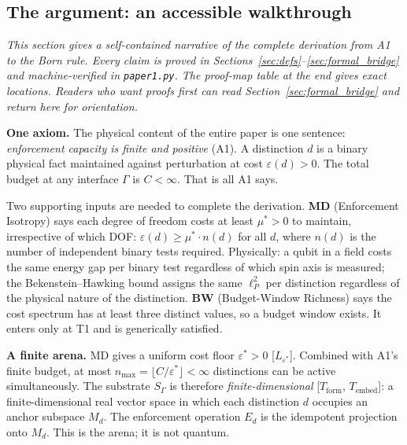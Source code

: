 \documentclass[11pt]{article}
\theoremstyle{remark}
\begin{document}
\subsection{The argument: an accessible walkthrough}
\label{sec:walkthrough}\label{sec:argument}

\noindent\textit{This section gives a self-contained narrative of the complete
derivation from A1 to the Born rule.  Every claim is proved in
Sections~\ref{sec:defs}--\ref{sec:formal_bridge} and machine-verified in
\texttt{paper1.py}.  The proof-map table at the end gives exact locations.
Readers who want proofs first can read Section~\ref{sec:formal_bridge} and
return here for orientation.}

\medskip

\noindent\textbf{One axiom.} The physical content of the entire paper is one
sentence: \emph{enforcement capacity is finite and positive} (A1).  A
distinction $d$ is a binary physical fact maintained against perturbation at
cost $\varepsilon(d) > 0$.  The total budget at any interface $\Gamma$ is
$C < \infty$.  That is all A1 says.

Two supporting inputs are needed to complete the derivation.  \textbf{MD}
(Enforcement Isotropy) says each degree of freedom costs at least $\mu^* > 0$
to maintain, irrespective of which DOF: $\varepsilon(d) \ge \mu^* \cdot n(d)$
for all $d$, where $n(d)$ is the number of independent binary tests required.
Physically: a qubit in a field costs the same energy gap per binary test
regardless of which spin axis is measured; the Bekenstein--Hawking bound
assigns the same $\ell_P^2$ per distinction regardless of the physical nature
of the distinction.  \textbf{BW} (Budget-Window Richness) says the cost
spectrum has at least three distinct values, so a budget window exists.  It
enters only at T1 and is generically satisfied.

\medskip

\noindent\textbf{A finite arena.}  MD gives a uniform cost floor $\varepsilon^*
> 0$ [$L_{\varepsilon^*}$].  Combined with A1's finite budget, at most
$n_{\max} = \lfloor C / \varepsilon^* \rfloor < \infty$ distinctions can be
active simultaneously.  The substrate $S_\Gamma$ is therefore
\emph{finite-dimensional} [$T_{\mathrm{form}}$, $T_{\mathrm{embed}}$]: a
finite-dimensional real vector space in which each distinction $d$ occupies an
anchor subspace $M_d$.  The enforcement operation $E_d$ is the idempotent
projection onto $M_d$.  This is the arena; it is not quantum.

\medskip
\end{document}
